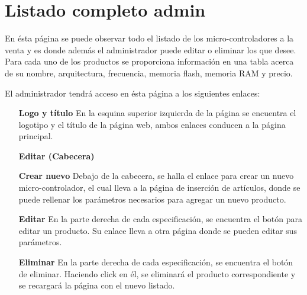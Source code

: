 \section{Listado completo admin}

En ésta página se puede observar todo el listado de los micro-controladores a la venta y es donde además el administrador puede editar o eliminar los que desee.
Para cada uno de los productos se proporciona información en una tabla acerca de su nombre, arquitectura, frecuencia, memoria flash, memoria RAM y precio.

El administrador tendrá acceso en ésta página a los siguientes enlaces:

\begin{itemize}
	\item[\textbf{Logo y título}] En la esquina superior izquierda de la página se encuentra el logotipo y el título de la página web, ambos enlaces conducen a la página principal.

	\item[\textbf{Editar (Cabecera)}]
	
	\item[\textbf{Crear nuevo}] Debajo de la cabecera, se halla el enlace para crear un nuevo micro-controlador, el cual lleva a la página de inserción de artículos, donde se puede rellenar los parámetros necesarios para agregar un nuevo producto.
	
	\item[\textbf{Editar}] En la parte derecha de cada especificación, se encuentra el botón para editar un producto. Su enlace lleva a otra página donde se pueden editar sus parámetros.
	
	\item[\textbf{Eliminar}] En la parte derecha de cada especificación, se encuentra el botón de eliminar. Haciendo click en él, se eliminará el producto correspondiente y se recargará la página con el nuevo listado.
\end{itemize}